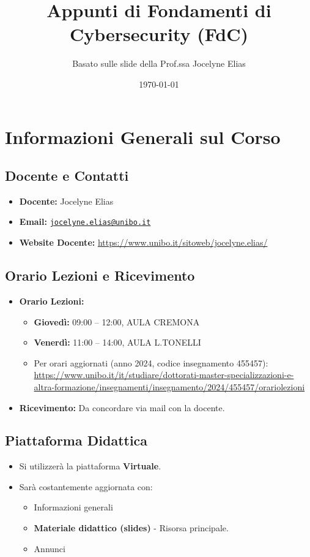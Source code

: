 \documentclass{article}
\title{Appunti di Fondamenti di Cybersecurity (FdC)}
\author{Basato sulle slide della Prof.ssa Jocelyne Elias}
\date{\today}
\begin{document}
\maketitle
\tableofcontents
\newpage

\section{Informazioni Generali sul Corso}

\subsection{Docente e Contatti}
\begin{itemize}
    \item \textbf{Docente:} Jocelyne Elias
    \item \textbf{Email:} \href{mailto:jocelyne.elias@unibo.it}{\texttt{jocelyne.elias@unibo.it}}
    \item \textbf{Website Docente:} \url{https://www.unibo.it/sitoweb/jocelyne.elias/}
\end{itemize}

\subsection{Orario Lezioni e Ricevimento}
\begin{itemize}
    \item \textbf{Orario Lezioni:}
    \begin{itemize}
        \item \textbf{Giovedì:} 09:00 – 12:00, AULA CREMONA
        \item \textbf{Venerdì:} 11:00 – 14:00, AULA L.TONELLI
        \item Per orari aggiornati (anno 2024, codice insegnamento 455457):\\ \url{https://www.unibo.it/it/studiare/dottorati-master-specializzazioni-e-altra-formazione/insegnamenti/insegnamento/2024/455457/orariolezioni}
    \end{itemize}
    \item \textbf{Ricevimento:} Da concordare via mail con la docente.
\end{itemize}

\subsection{Piattaforma Didattica}
\begin{itemize}
    \item Si utilizzerà la piattaforma \textbf{Virtuale}.
    \item Sarà costantemente aggiornata con:
    \begin{itemize}
        \item Informazioni generali
        \item \textbf{Materiale didattico (slides)} - Risorsa principale.
        \item Annunci
    \end{itemize}
\end{itemize}
\end{document}
